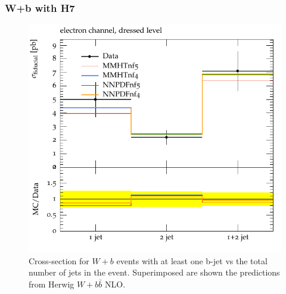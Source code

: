\documentclass[11pt]{cernrep} \usepackage{graphicx,epsfig} 
\newcommand{\Herwig}{H\protect\scalebox{0.8}{ERWIG}7\xspace}
\begin{document}
\subsubsection{W+b with \Herwig}
\label{sec:WHerwig}

\begin{figure}[htbp]
\begin{center}
   \includegraphics[scale=0.65]{figs/wbb/herwig/d01-x01-y02.pdf}
\end{center}
\caption{Cross-section for $W+b$ events with at least one b-jet vs the total number of jets in the event. Superimposed are
shown the predictions from Herwig $W+b\bar{b}$ NLO.}
\label{wbb-njet-herwig}
\end{figure}
\end{document}
